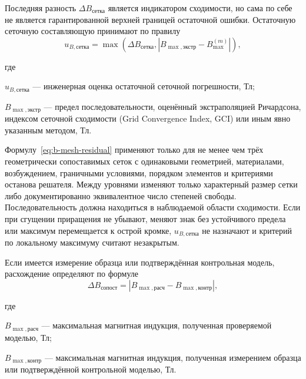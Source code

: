 \documentclass[14pt,a4paper]{extarticle}
\newenvironment{whereblock}
 {\par\noindent где\par
  \begin{list}{}{\setlength{\leftmargin}{12.5mm}
                  \setlength{\itemindent}{-12.5mm}
                  \setlength{\itemsep}{0pt}
                  \setlength{\parsep}{0pt}
                  \setlength{\topsep}{0pt}}}
 {\end{list}}
\newcommand{\whereitem}[2]{\item[] #1 --- #2}
\begin{document}
Последняя разность $\Delta B_{\text{сетка}}$ является индикатором
сходимости, но сама по себе не является гарантированной верхней границей
остаточной ошибки. Остаточную сеточную составляющую принимают по правилу
\begin{equation}
 u_{B,\text{сетка}}=
 \max\left(
 \Delta B_{\text{сетка}},
 \left|B_{\max,\text{экстр}}-B_{\max}^{(m)}\right|
 \right),
 \label{eq:b-mesh-residual}
\end{equation}
\begin{whereblock}
\whereitem{$u_{B,\text{сетка}}$}{инженерная оценка остаточной сеточной
погрешности, Тл;}
\whereitem{$B_{\max,\text{экстр}}$}{предел последовательности, оценённый
экстраполяцией Ричардсона, индексом сеточной сходимости
(Grid Convergence Index, GCI) или иным явно указанным методом, Тл.}
\end{whereblock}

Формулу~\eqref{eq:b-mesh-residual} применяют только для не менее чем трёх
геометрически сопоставимых сеток с одинаковыми геометрией, материалами,
возбуждением, граничными условиями, порядком элементов и критериями останова
решателя. Между уровнями изменяют только характерный размер сетки либо
документированно эквивалентное число степеней свободы. Последовательность
должна находиться в наблюдаемой области сходимости. Если при сгущении
приращения не убывают, меняют знак без устойчивого предела или максимум
перемещается к острой кромке, $u_{B,\text{сетка}}$ не назначают и критерий
по локальному максимуму считают незакрытым.

Если имеется измерение образца или подтверждённая контрольная модель,
расхождение определяют по формуле
\begin{equation}
 \Delta B_{\text{сопост}}=
 \left|
 B_{\max,\text{расч}}-
 B_{\max,\text{контр}}
 \right|,
 \label{eq:b-validation-uncertainty}
\end{equation}
\begin{whereblock}
\whereitem{$B_{\max,\text{расч}}$}{максимальная магнитная индукция,
полученная проверяемой моделью, Тл;}
\whereitem{$B_{\max,\text{контр}}$}{максимальная магнитная индукция,
полученная измерением образца или подтверждённой контрольной моделью,
Тл.}
\end{whereblock}
\end{document}
